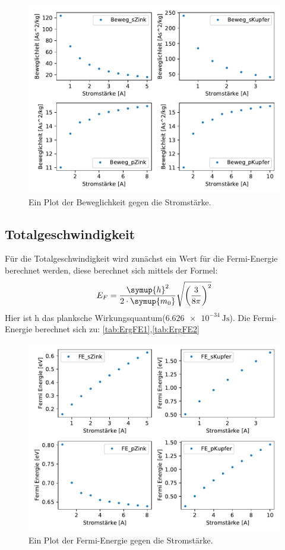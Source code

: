     \begin{figure}[H]
        \centering
        \includegraphics[width=1.1\textwidth]{build/Beweglichkeit.pdf}
        \caption{Ein Plot der Beweglichkeit gegen die Stromstärke.}
        \label{img:Beweg}
    \end{figure}


    \subsection{Totalgeschwindigkeit}


    Für die Totalgeschwindigkeit wird zunächst ein Wert für die Fermi-Energie berechnet werden, diese berechnet sich mittels der Formel:
    \begin{equation}
        E_F = \frac{\symup{h}^2}{2 \cdot \symup{m_0}}\sqrt{\left(\frac{3}{8\pi}\right)^2} \nonumber
    \end{equation}
    Hier ist h das planksche Wirkungsquantum($\SI{6.626e-34}{\joule\second}$).
    Die Fermi-Energie berechnet sich zu: \ref{tab:ErgFE1},\ref{tab:ErgFE2}

    \begin{figure}[H]
        \centering
        \includegraphics[width=1.1\textwidth]{build/Fermi.pdf}
        \caption{Ein Plot der Fermi-Energie gegen die Stromstärke.}
        \label{img:FE}
    \end{figure}

